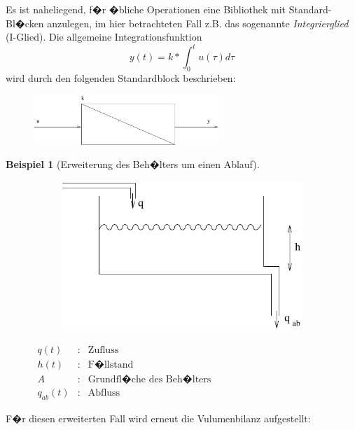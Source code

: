 \documentclass[12pt,a4paper,ngerman]{scrartcl}
\newtheorem{bsp}{Beispiel}[section] %
\begin{document}
Es ist naheliegend, f�r �bliche Operationen eine Bibliothek mit Standard-Bl�cken anzulegen, im hier betrachteten Fall z.B. das sogenannte \emph{Integrierglied} (I-Glied).
Die allgemeine Integrationsfunktion
\begin{equation*}
  y(t)=k*\int_0^t{u(\tau)d\tau}
\end{equation*}
wird durch den folgenden Standardblock beschrieben:
\begin{figure}[H]
  \includegraphics[width=7cm]{sysregel_iglied}
\end{figure}
\begin{bsp}[Erweiterung des Beh�lters um einen Ablauf]
\end{bsp}
\begin{figure}[H]
\begin{minipage}{0.4\linewidth}
\begin{figure}[H]
  \includegraphics[width=.9\linewidth]{sysregel_bsp_2}  
\end{figure}
\end{minipage}
\begin{minipage}{0.6\linewidth}
$\begin{array}{lll}
q(t)&:&\text{Zufluss}\\
h(t)&:&\text{F�llstand}\\
A&:&\text{Grundfl�che des Beh�lters}\\
q_{ab}(t)&:&\text{Abfluss}
\end{array}$
\end{minipage}
\end{figure}
F�r diesen erweiterten Fall wird erneut die Vulumenbilanz aufgestellt:
\end{document}
